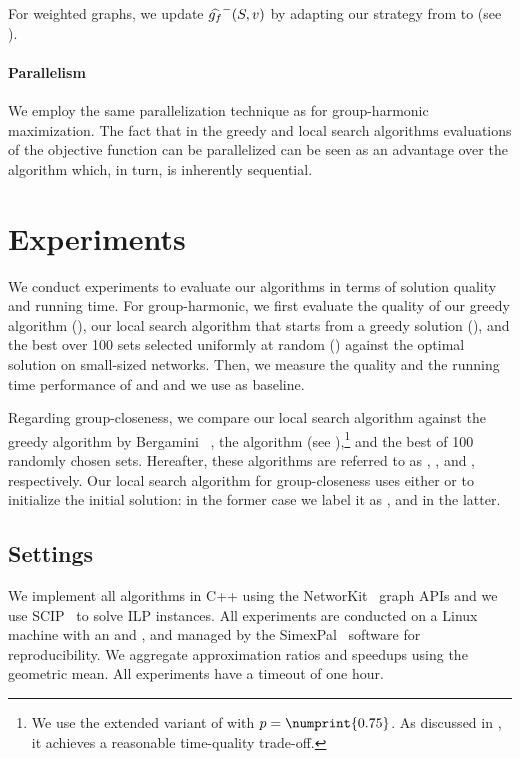 For weighted graphs, we update $\widehat{g_f}^-(S, v)$ by adapting our strategy from \gharm
to \gfarn (see ).

\paragraph{Parallelism}
%
We employ the same parallelization technique as for group-harmonic maximization. The
fact that in the greedy and local search algorithms evaluations of the objective function
can be parallelized can be seen as an advantage over the \growshrink algorithm which, in turn,
is inherently sequential.

\section{Experiments}
%
We conduct experiments to evaluate our algorithms in terms of solution quality and running time.
For group-harmonic, we first evaluate the quality of our greedy algorithm (\greedyh),
our local search algorithm that starts from a greedy solution (\greedylsh), and the best
over 100 sets selected uniformly at random (\bestrandomh) against the optimal
solution on small-sized networks. Then, we measure the quality and the running time
performance of \greedyh and \greedylsh and we use \bestrandomh as baseline.

Regarding group-closeness, we compare our local search algorithm against the
greedy algorithm by Bergamini \etal~\cite{DBLP:conf/alenex/BergaminiGM18}, the
\growshrink algorithm (see ),\footnote{We
use the extended variant of \growshrink with $p = \numprint{0.75}$. As
discussed in ,
it achieves a reasonable time-quality trade-off.} and the best of 100 randomly
chosen sets. Hereafter, these algorithms are referred to as \greedyc, \gs, and
\bestrandomc, respectively.
%
Our local search algorithm for group-closeness uses either \greedyc or \gs
to initialize the initial solution: in the former case we label it as
\greedylsc, and \gslsc in the latter.

\subsection{Settings}
%
We implement all algorithms in C++ using the NetworKit~\cite{DBLP:journals/netsci/StaudtSM16}
graph APIs and we use SCIP~\cite{gamrath2020scip} to solve ILP instances.
All experiments are conducted on a Linux machine with an \CPU and \RAM,
and managed by the SimexPal~\cite{DBLP:journals/algorithms/AngrimanGLMNPT19}
software for reproducibility. We aggregate approximation ratios and speedups
using the geometric mean. All experiments have a timeout of one hour.

